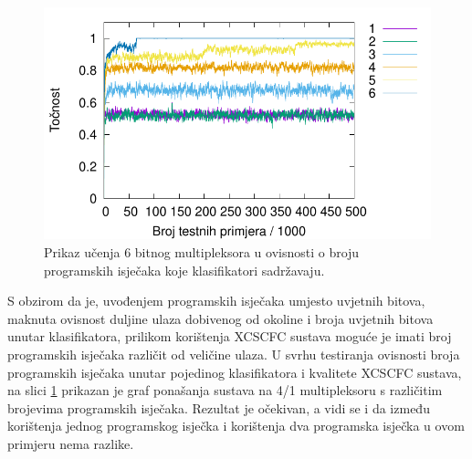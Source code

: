 \documentclass[times, utf8, zavrsni]{fer}
\begin{document}
\begin{figure}[!h]
    \centering
    \includegraphics[width=12cm]{img/mux_cond/6bitcond.pdf}
    \caption{Prikaz učenja 6 bitnog multipleksora u ovisnosti o broju programskih isječaka koje klasifikatori sadržavaju.}
    \label{img:6bitcond}
\end{figure}
S obzirom da je, uvođenjem programskih isječaka umjesto uvjetnih bitova, maknuta ovisnost duljine ulaza dobivenog od okoline i broja uvjetnih bitova unutar klasifikatora, prilikom korištenja XCSCFC sustava moguće je imati broj programskih isječaka različit od veličine ulaza.
U svrhu testiranja ovisnosti broja programskih isječaka unutar pojedinog klasifikatora i kvalitete XCSCFC sustava, na slici \ref{img:6bitcond} prikazan je graf ponašanja sustava na 4/1 multipleksoru s različitim brojevima programskih isječaka.
Rezultat je očekivan, a vidi se i da između korištenja jednog programskog isječka i korištenja dva programska isječka u ovom primjeru nema razlike.
\end{document}
